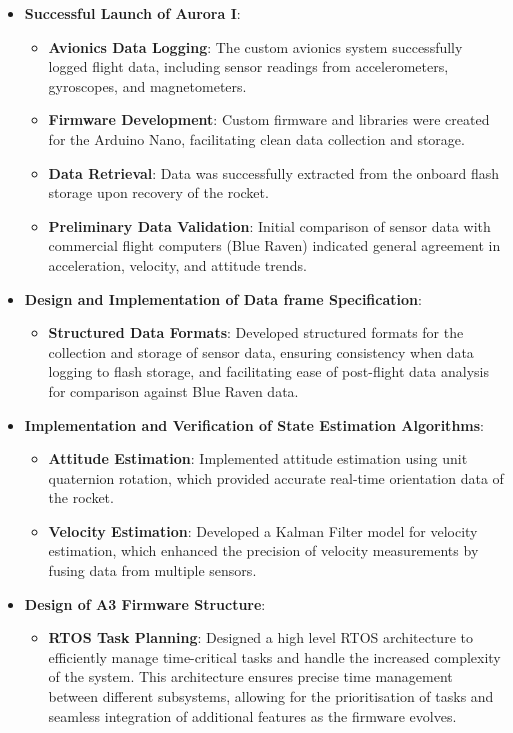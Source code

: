 \begin{itemize}
    \item \textbf{Successful Launch of Aurora I}:
    \begin{itemize}
        \item \textbf{Avionics Data Logging}: The custom avionics system successfully logged flight data, including sensor readings from accelerometers, gyroscopes, and magnetometers.
        \item \textbf{Firmware Development}: Custom firmware and libraries were created for the Arduino Nano, facilitating clean data collection and storage.
        \item \textbf{Data Retrieval}: Data was successfully extracted from the onboard flash storage upon recovery of the rocket.
        \item \textbf{Preliminary Data Validation}: Initial comparison of sensor data with commercial flight computers (Blue Raven) indicated general agreement in acceleration, velocity, and attitude trends.
    \end{itemize}
    \item \textbf{Design and Implementation of Data frame Specification}:
\begin{itemize}
        \item \textbf{Structured Data Formats}: Developed structured formats for the collection and storage of sensor data, ensuring consistency when data logging to flash storage, and facilitating ease of post-flight data analysis for comparison against Blue Raven data.
\end{itemize}
    \item \textbf{Implementation and Verification of State Estimation Algorithms}:
    \begin{itemize}
        \item \textbf{Attitude Estimation}: Implemented attitude estimation using unit quaternion rotation, which provided accurate real-time orientation data of the rocket.
        \item \textbf{Velocity Estimation}: Developed a Kalman Filter model for velocity estimation, which enhanced the precision of velocity measurements by fusing data from multiple sensors.
    \end{itemize}
    \item \textbf{Design of A3 Firmware Structure}:
\begin{itemize}    
    \item \textbf{RTOS Task Planning}: Designed a high level RTOS architecture to efficiently manage time-critical tasks and handle the increased complexity of the system. This architecture ensures precise time management between different subsystems, allowing for the prioritisation of tasks and seamless integration of additional features as the firmware evolves. 

\end{itemize}
\end{itemize}
